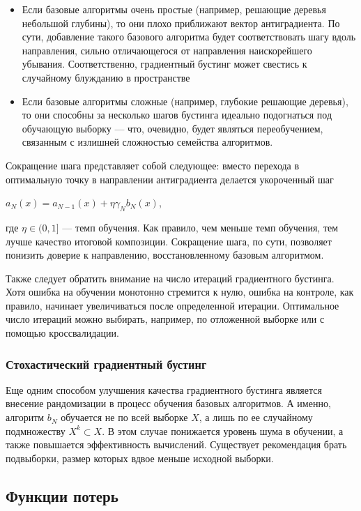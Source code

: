 \documentclass{article}
\begin{document}
\begin{itemize}
	\item Если базовые алгоритмы очень простые (например, решающие деревья небольшой глубины), то они плохо приближают вектор антиградиента. По сути, добавление такого базового алгоритма будет соответствовать шагу вдоль направления, сильно отличающегося от направления наискорейшего убывания. Соответственно, градиентный бустинг может свестись к случайному блужданию в
	пространстве
	\item Если базовые алгоритмы сложные (например, глубокие решающие деревья), то они способны за несколько шагов бустинга идеально подогнаться под обучающую выборку — что, очевидно, будет являться переобучением, связанным с излишней сложностью семейства алгоритмов.
\end{itemize}

Сокращение шага представляет собой следующее: вместо перехода в оптимальную точку в направлении антиградиента
делается укороченный шаг

$a_N(x) = a_{N-1}(x) + \eta\gamma_Nb_N(x)$,

где $\eta \in (0,1]$ --- темп обучения. Как правило, чем меньше темп обучения, тем лучше качество итоговой композиции. Сокращение шага, по сути, позволяет понизить доверие к направлению, восстановленному базовым алгоритмом.

Также следует обратить внимание на число итераций градиентного бустинга. Хотя ошибка на обучении монотонно стремится к нулю, ошибка на контроле, как правило, начинает увеличиваться после определенной итерации. Оптимальное число итераций можно выбирать, например, по отложенной выборке или с помощью кроссвалидации.


\subsubsection{Стохастический градиентный бустинг}

Еще одним способом улучшения качества градиентного бустинга является внесение рандомизации в процесс обучения базовых алгоритмов. А именно, алгоритм $b_N$ обучается не по всей выборке $X$, а лишь по ее случайному подмножеству $X^k \subset X$. В этом случае понижается уровень шума в обучении, а также повышается эффективность вычислений. Существует рекомендация брать подвыборки, размер которых вдвое меньше исходной выборки.

\subsection{Функции потерь}
\end{document}
